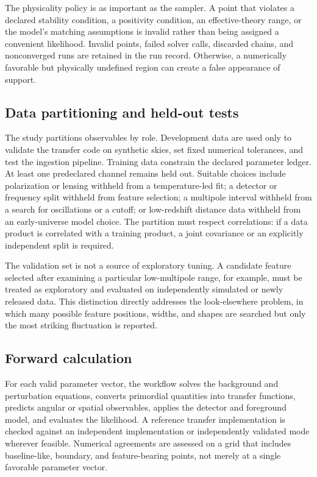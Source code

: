 \documentclass[10pt,conference]{IEEEtran}
\begin{document}
The physicality policy is as important as the sampler. A point that violates a declared stability condition, a positivity condition, an effective-theory range, or the model's matching assumptions is invalid rather than being assigned a convenient likelihood. Invalid points, failed solver calls, discarded chains, and nonconverged runs are retained in the run record. Otherwise, a numerically favorable but physically undefined region can create a false appearance of support.

\subsection{Data partitioning and held-out tests}

The study partitions observables by role. Development data are used only to validate the transfer code on synthetic skies, set fixed numerical tolerances, and test the ingestion pipeline. Training data constrain the declared parameter ledger. At least one predeclared channel remains held out. Suitable choices include polarization or lensing withheld from a temperature-led fit; a detector or frequency split withheld from feature selection; a multipole interval withheld from a search for oscillations or a cutoff; or low-redshift distance data withheld from an early-universe model choice. The partition must respect correlations: if a data product is correlated with a training product, a joint covariance or an explicitly independent split is required.

The validation set is not a source of exploratory tuning. A candidate feature selected after examining a particular low-multipole range, for example, must be treated as exploratory and evaluated on independently simulated or newly released data. This distinction directly addresses the look-elsewhere problem, in which many possible feature positions, widths, and shapes are searched but only the most striking fluctuation is reported.

\subsection{Forward calculation}

For each valid parameter vector, the workflow solves the background and perturbation equations, converts primordial quantities into transfer functions, predicts angular or spatial observables, applies the detector and foreground model, and evaluates the likelihood. A reference transfer implementation is checked against an independent implementation or independently validated mode wherever feasible. Numerical agreements are assessed on a grid that includes baseline-like, boundary, and feature-bearing points, not merely at a single favorable parameter vector.
\end{document}
